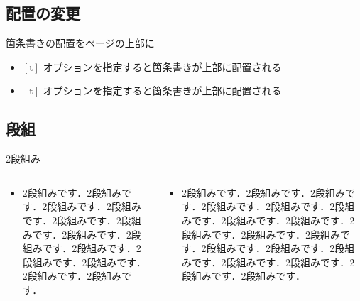 \subsection{配置の変更}

\begin{frame}[t]{箇条書きの配置をページの上部に}
  \begin{itemize}
    \item $[\mbox{t}]$ オプションを指定すると箇条書きが上部に配置される
    \item $[\mbox{t}]$ オプションを指定すると箇条書きが上部に配置される
  \end{itemize}
\end{frame}

\subsection{段組}

\begin{frame}{2段組み}
  \begin{columns}
    \begin{column}{0.5\textwidth}
      \begin{itemize}
        \item 2段組みです．2段組みです．2段組みです．2段組みです．2段組みです．2段組みです．2段組みです．2段組みです．2段組みです．2段組みです．2段組みです．2段組みです．2段組みです．
      \end{itemize}
    \end{column}
    \begin{column}{0.5\textwidth}
      \begin{itemize}
        \item 2段組みです．2段組みです．2段組みです．2段組みです．2段組みです．2段組みです．2段組みです．2段組みです．2段組みです．2段組みです．2段組みです．2段組みです．2段組みです．2段組みです．2段組みです．2段組みです．2段組みです．2段組みです．
      \end{itemize}
    \end{column}
  \end{columns}
\end{frame}

